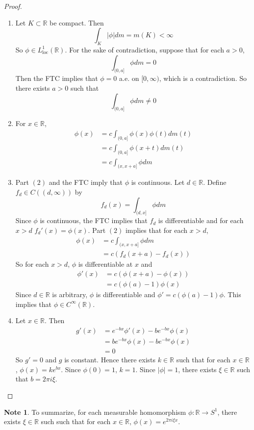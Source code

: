 \documentclass{book}
\theoremstyle{definition}
\newtheorem{note}[definition]{Note}
\newcommand{\R}{\mathbb{R}}
\DeclareMathOperator*{\0}{\mbf{0}}
\DeclareMathOperator*{\1}{\mbf{1}}
\newcommand{\Rg}{[0,\infty)}
\newcommand{\loc}{\text{loc}}
\begin{document}
	\begin{proof}\
	\begin{enumerate}
	\item Let $K \subset \R$ be compact. Then $$\int_K |\phi| dm = m(K) < \infty$$ So $\phi \in L^1_{\loc}(\R)$. For the sake of contradiction, suppose that for each $a >0$, $$\int_{(0,a]}\phi dm = 0$$ 
	Then the FTC implies that $\phi = 0$ a.e. on $\Rg$, which is a contradiction. So there exists $a > 0$ such that $$\int_{(0,a]}\phi dm \neq 0$$
	\item For $x \in \R$, 
	\begin{align*}
	\phi(x) 
	&= c \int_{(0,a]} \phi(x)\phi(t) dm(t) \\
	&= c \int_{(0,a]} \phi(x+t) dm(t) \\
	&= c \int_{(x,x+a]} \phi dm 
	\end{align*}
	\item Part $(2)$ and the FTC imply that $\phi$ is continuous. Let $d \in \R$. Define $f_d \in C((d, \infty))$ by $$f_d(x) = \int_{(d, x]} \phi dm$$ 
	Since $\phi$ is continuous, the FTC implies that $f_d$ is differentiable and for each $x >d$ $f_d'(x) = \phi(x)$. Part $(2)$ implies that for each $x > d$,
	\begin{align*}
	\phi(x) 
	&= c \int_{(x,x+a]} \phi dm \\
	&= c(f_d(x+a) - f_d(x))
	\end{align*}
	So for each $x > d$, $\phi$ is differentiable at $x$ and 
	\begin{align*}
	\phi'(x) 
	&= c(\phi(x+a) - \phi(x)) \\
	&= c(\phi(a) - 1) \phi(x)
\end{align*}	 
	Since $d \in \R$ is arbitrary, $\phi$ is differentiable and $\phi' = c(\phi(a) - 1) \phi$. This implies that $\phi \in C^{\infty}(\R)$.
	\item Let $x \in \R$. Then 
	\begin{align*}
	g'(x) 
	&= e^{-bx}\phi'(x) - be^{-bx}\phi(x) \\
	&= be^{-bx} \phi(x) - be^{-bx}\phi(x) \\
	&= 0
	\end{align*}
	So $g' = 0$ and $g$ is constant. Hence there exists $k \in \R$ such that for each $x \in \R$, $\phi(x) = ke^{bx}$. Since $\phi(0) = 1$, $k = 1$. Since $|\phi| = 1$, there exists $\xi \in \R$ such that $b = 2 \pi i \xi$. 
	\end{enumerate}
	\end{proof}
	
	\begin{note}
	To summarize, for each measurable homomorphism $\phi:\R \rightarrow S^1$, there exists $\xi \in \R$ such  such that for each $x \in \R$, $\phi(x) = e^{2 \pi i  \xi x}$. 
	\end{note}
	
\end{document}
